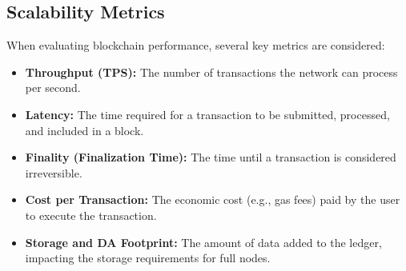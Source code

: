 \subsection{Scalability Metrics}
When evaluating blockchain performance, several key metrics are considered:
\begin{itemize}
    \item \textbf{Throughput (TPS):} The number of transactions the network can process per second.
    \item \textbf{Latency:} The time required for a transaction to be submitted, processed, and included in a block.
    \item \textbf{Finality (Finalization Time):} The time until a transaction is considered irreversible.
    \item \textbf{Cost per Transaction:} The economic cost (e.g., gas fees) paid by the user to execute the transaction.
    \item \textbf{Storage and DA Footprint:} The amount of data added to the ledger, impacting the storage requirements for full nodes.
\end{itemize}